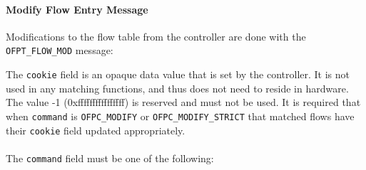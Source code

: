 \paragraph{Modify Flow Entry Message}
Modifications to the flow table from the controller are done with the \verb|OFPT_FLOW_MOD| message:


The \verb|cookie| field is an opaque data value that is set by the
controller.  It is not used in any matching functions, and thus does not
need to reside in hardware.  The value -1 (0xffffffffffffffff) is
reserved and must not be used.  It is required that when \verb|command| is
\verb|OFPC_MODIFY| or \verb|OFPC_MODIFY_STRICT| that matched flows have
their \verb|cookie| field updated appropriately.
\\\\
The \verb|command| field must be one of the following:

